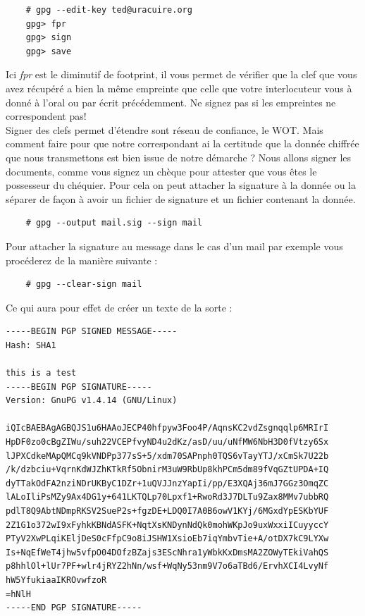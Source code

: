 \documentclass[a4paper]{article}
\begin{document}
\begin{verbatim}
    # gpg --edit-key ted@uracuire.org
    gpg> fpr
    gpg> sign
    gpg> save
\end{verbatim}

Ici \emph{fpr} est le diminutif de footprint, il vous permet de vérifier que la
clef que vous avez récupéré a bien la même empreinte que celle que votre
interlocuteur vous à donné à l'oral ou par écrit précédemment.
Ne signez pas si les empreintes ne correspondent pas!
\\
Signer des clefs permet d'étendre sont réseau de confiance, le WOT. Mais comment
faire pour que notre correspondant ai la certitude que la donnée chiffrée que
nous transmettons est bien issue de notre démarche ? Nous allons signer les
documents, comme vous signez un chèque pour attester que vous êtes le possesseur
du chéquier. Pour cela on peut attacher la signature à la donnée ou la séparer
de façon à avoir un fichier de signature et un fichier contenant la donnée.

\begin{verbatim}
    # gpg --output mail.sig --sign mail
\end{verbatim}

Pour attacher la signature au message dans le cas d'un mail par exemple vous
procéderez de la manière suivante :
\begin{verbatim}
    # gpg --clear-sign mail
\end{verbatim}
Ce qui aura pour effet de créer un texte de la sorte :
\begin{verbatim}
-----BEGIN PGP SIGNED MESSAGE-----
Hash: SHA1

this is a test
-----BEGIN PGP SIGNATURE-----
Version: GnuPG v1.4.14 (GNU/Linux)

iQIcBAEBAgAGBQJS1u6HAAoJECP40hfpyw3Foo4P/AqnsKC2vdZsgnqqlp6MRIrI
HpDF0zo0cBgZIWu/suh22VCEPfvyND4u2dKz/asD/uu/uNfMW6NbH3D0fVtzy6Sx
lJPXCdkeMApQMCq9kVNDPp377sS+5/xdm70SAPnph0TQS6vTayYTJ/xCmSk7U22b
/k/dzbciu+VqrnKdWJZhKTkRf5ObnirM3uW9RbUp8khPCm5dm89fVqGZtUPDA+IQ
dyTTakOdFA2nziNDrUKByC1DZr+1uQVJJnzYapIi/pp/E3XQAj36mJ7GGz3OmqZC
lALoIliPsMZy9Ax4DG1y+641LKTQLp70Lpxf1+RwoRd3J7DLTu9Zax8MMv7ubbRQ
pdlT8Q9AbtNDmpRKSV2SueP2s+fgzDE+LDQ0I7A0B6owV1KYj/6MGxdYpESKbYUF
2Z1G1o372wI9xFyhkKBNdASFK+NqtXsKNDynNdQk0mohWKpJo9uxWxxiICuyyccY
PTyV2XwPLqiKEljDeS0cFfpC9o8iJSHW1XsioEb7iqYmbvTie+A/otDX7kC9LYXw
Is+NqEfWeT4jhw5vfpO04DOfzBZajs3EScNhra1yWbkKxDmsMA2ZOWyTEkiVahQS
p8hhlOl+lUr7PF+wlr4jRYZ2hNn/wsf+WqNy53nm9V7o6aTBd6/ErvhXCI4LvyNf
hW5YfukiaaIKROvwfzoR
=hNlH
-----END PGP SIGNATURE-----
\end{verbatim}
\end{document}
